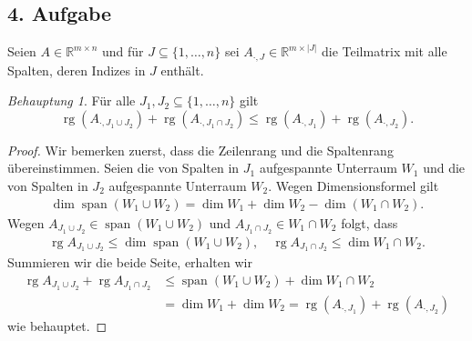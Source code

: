 \documentclass[fleqn,draft,a5paper]{article}
\providecommand{\abs}[1]{\left\lvert#1\right\rvert}
\theoremstyle{remark}
\newtheorem*{Behauptung}{Behauptung}
\DeclareMathOperator{\rg}{rg}
\DeclareMathOperator{\sspan}{span}
\begin{document}
\subsection{4. Aufgabe}
Seien \(A \in \mathbb{R}^{m\times n}\) und für \(J \subseteq \{1, \ldots, n\}\) sei \(A_{\cdot,J} \in \mathbb{R}^{m \times
  \abs{J}}\) die Teilmatrix mit alle Spalten, deren Indizes in \(J\)
enthält.
\begin{Behauptung}
  Für alle \(J_{1}, J_{2} \subseteq \{1, \ldots, n\}\) gilt
  \[\rg(A_{\cdot,J_{1} \cup J_{2}}) + \rg(A_{\cdot,J_{1} \cap J_{2}}) \le
    \rg(A_{\cdot,J_{1}}) + \rg(A_{\cdot,J_{2}}).\]
\end{Behauptung}
\begin{proof}
  Wir bemerken zuerst, dass die Zeilenrang und die Spaltenrang
  übereinstimmen.  Seien die von Spalten in \(J_{1}\) aufgespannte
  Unterraum \(W_{1}\) und die von Spalten in \(J_{2}\) aufgespannte
  Unterraum \(W_{2}\).  Wegen Dimensionsformel gilt
  \begin{align*}
    \dim \sspan{(W_{1} \cup W_{2})} = \dim W_{1} + \dim W_{2} - \dim(W_{1} \cap W_{2}).
  \end{align*}
  Wegen \(A_{J_{1}\cup J_{2}} \in \sspan(W_{1} \cup W_{2})\) und \(A_{J_{1}\cap
    J_{2}} \in W_{1} \cap W_{2}\) folgt, dass
  \begin{align*}
    \rg A_{J_{1}\cup J_{2}} \le \dim \sspan(W_{1} \cup W_{2}), \quad \rg A_{J_{1}\cap
    J_{2}} \le  \dim W_{1} \cap W_{2}.
  \end{align*}
  Summieren wir die beide Seite, erhalten wir
  \begin{align*}
    \rg A_{J_{1}\cup J_{2}} + \rg A_{J_{1}\cap J_{2}}
    &\le \sspan(W_{1} \cup W_{2}) +  \dim W_{1} \cap W_{2} \\
    &= \dim W_{1} + \dim W_{2} = \rg(A_{\cdot,J_{1}}) + \rg(A_{\cdot,J_{2}})
  \end{align*}
  wie behauptet.
\end{proof}
\end{document}
